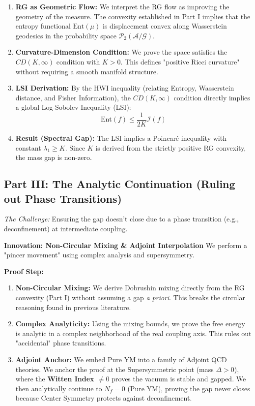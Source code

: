 \begin{enumerate}
    \item \textbf{RG as Geometric Flow:} We interpret the RG flow as improving the geometry of the measure. The convexity established in Part I implies that the entropy functional $\text{Ent}(\mu)$ is displacement convex along Wasserstein geodesics in the probability space $\mathcal{P}_2(\mathcal{A}/\mathcal{G})$.
    \item \textbf{Curvature-Dimension Condition:} We prove the space satisfies the $CD(K, \infty)$ condition with $K > 0$. This defines "positive Ricci curvature" without requiring a smooth manifold structure.
    \item \textbf{LSI Derivation:} By the HWI inequality (relating Entropy, Wasserstein distance, and Fisher Information), the $CD(K, \infty)$ condition directly implies a global Log-Sobolev Inequality (LSI):
    \begin{equation}
        \text{Ent}(f) \leq \frac{1}{2K} \mathcal{I}(f)
    \end{equation}
    \item \textbf{Result (Spectral Gap):} The LSI implies a Poincaré inequality with constant $\lambda_1 \geq K$. Since $K$ is derived from the strictly positive RG convexity, the mass gap is non-zero.
\end{enumerate}

\subsection*{Part III: The Analytic Continuation (Ruling out Phase Transitions)}

\textit{The Challenge:} Ensuring the gap doesn't close due to a phase transition (e.g., deconfinement) at intermediate coupling.

\textbf{Innovation: Non-Circular Mixing \& Adjoint Interpolation}
We perform a "pincer movement" using complex analysis and supersymmetry.

\textbf{Proof Step:}

\begin{enumerate}
    \item \textbf{Non-Circular Mixing:} We derive Dobrushin mixing directly from the RG convexity (Part I) without assuming a gap \textit{a priori}. This breaks the circular reasoning found in previous literature.
    \item \textbf{Complex Analyticity:} Using the mixing bounds, we prove the free energy is analytic in a complex neighborhood of the real coupling axis. This rules out "accidental" phase transitions.
    \item \textbf{Adjoint Anchor:} We embed Pure YM into a family of Adjoint QCD theories. We anchor the proof at the Supersymmetric point (mass $\Delta > 0$), where the \textbf{Witten Index $\neq 0$} proves the vacuum is stable and gapped. We then analytically continue to $N_f = 0$ (Pure YM), proving the gap never closes because Center Symmetry protects against deconfinement.
\end{enumerate}

